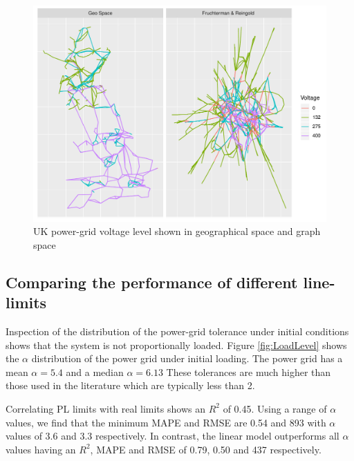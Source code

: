 \documentclass{article}
\begin{document}


\begin{figure}
    \centering
    \includegraphics{Figures/ggMapColouredEdges.pdf}
    \caption{UK power-grid voltage level shown in geographical space and graph space}
    \label{fig:VoltageMap}
\end{figure}

\subsection{Comparing the performance of different line-limits}

Inspection of the distribution of the power-grid tolerance under initial conditions shows that the system is not proportionally loaded. Figure \ref{fig:LoadLevel} shows the $\alpha$ distribution  of the power grid under initial loading. The power grid has a mean $\alpha = 5.4$ and a median $\alpha = 6.13$ These tolerances are much higher than those used in the literature which are typically less than 2.

Correlating PL limits with real limits shows an  $R^2$ of 0.45. Using a range of $\alpha$ values, we find that the minimum MAPE and RMSE are 0.54 and 893 with $\alpha$ values of 3.6 and 3.3 respectively. In contrast, the linear model outperforms all $\alpha$ values having an $R^2$, MAPE and RMSE of 0.79, 0.50 and 437 respectively.
\end{document}
